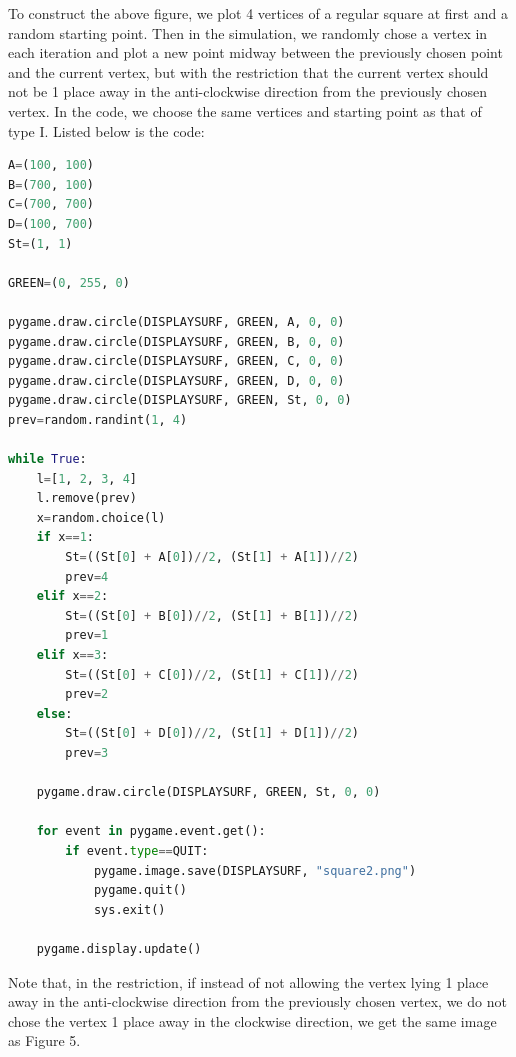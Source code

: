 \documentclass{article}
\begin{document}
To construct the above figure, we plot 4 vertices of a regular square at first and a random starting point. Then in the simulation, we randomly chose a vertex in each iteration and plot a new point midway between the previously chosen point and the current vertex, but with the restriction that the current vertex should not be 1 place away in the anti-clockwise direction from the previously chosen vertex. In the code, we choose the same vertices and starting point as that of type I. Listed below is the code:
\begin{lstlisting}[language=Python, frame=single]
A=(100, 100)
B=(700, 100)
C=(700, 700)
D=(100, 700)
St=(1, 1)

GREEN=(0, 255, 0)

pygame.draw.circle(DISPLAYSURF, GREEN, A, 0, 0)
pygame.draw.circle(DISPLAYSURF, GREEN, B, 0, 0)
pygame.draw.circle(DISPLAYSURF, GREEN, C, 0, 0)
pygame.draw.circle(DISPLAYSURF, GREEN, D, 0, 0)
pygame.draw.circle(DISPLAYSURF, GREEN, St, 0, 0)
prev=random.randint(1, 4)

while True:
    l=[1, 2, 3, 4]
    l.remove(prev)
    x=random.choice(l)
    if x==1:
        St=((St[0] + A[0])//2, (St[1] + A[1])//2)
        prev=4
    elif x==2:
        St=((St[0] + B[0])//2, (St[1] + B[1])//2)
        prev=1
    elif x==3:
        St=((St[0] + C[0])//2, (St[1] + C[1])//2)
        prev=2
    else:
        St=((St[0] + D[0])//2, (St[1] + D[1])//2)
        prev=3
    
    pygame.draw.circle(DISPLAYSURF, GREEN, St, 0, 0)
    
    for event in pygame.event.get():
        if event.type==QUIT:
            pygame.image.save(DISPLAYSURF, "square2.png")
            pygame.quit()
            sys.exit()
            
    pygame.display.update()
\end{lstlisting}
Note that, in the restriction, if instead of not allowing the vertex lying 1 place away in the anti-clockwise direction from the previously chosen vertex, we do not chose the vertex 1 place away in the clockwise direction, we get the same image as Figure 5.
\end{document}
